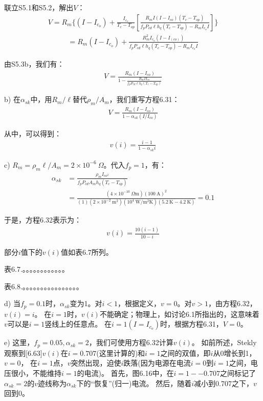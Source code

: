 联立S5.1和S5.2，解出$V$：
\begin{align*}%
V=R_m\{(I-I_{c_o})+\frac{I_{c_o}}{T_c-T_{op}}[\frac{R_mI(I-I_{co})(T_c-T_{op})}{f_pP_{cd}\ell h_q(T_c-T_{op})-R_mI_{c_o}I}]\} \tag{S5.3a}
\end{align*}
\begin{align*}%
=R_m(I-I_{c_o})+\frac{R_m^2I_{c_o}(I-I_(co))}{f_pP_{cd}\ell h_q(T_c-T_{op})-R_mI_{c_o}I} \tag{S5.3b}
\end{align*}

由S5.3b，我们有：
\begin{align*}%
V=\frac{R_m(I-I_{co})}{1-\frac{R_mII_{co}}{f_pP_{cd}\ell h_q(T_c-T_{op})}} \tag{6.31}
\end{align*}

b) 在$\alpha_{sk}$中，用$R_m/\ell$替代$\rho_m/A_m$，我们重写方程6.31：
\begin{align*}%
V=\frac{R_m(I-I_{co})}{1-\alpha_{sk}(I/I_{co})} \tag{S5.4}
\end{align*}

从中，可以得到：
\begin{align*}%
v(i)=\frac{i-1}{1-\alpha_{sk}i} \tag{6.32}
\end{align*}

c) $R_m=\rho_m \ell/A_m=2\times 10^{-6}\ \Omega$。代入$f_p=1$，有：
\begin{align*}%
\alpha_{sk}&=\frac{\rho_mI_{co^2}}{f_pP_{cd}A_mh_q(T_c-T_{op})}\\
&=\frac{(4\times10^{-10}\ \Omega\mathrm{m})(100\ \mathrm{A})^2}{(1)(2\times10^{-2}\ \mathrm{m^2})(10^4\ \mathrm{W/m^2K})(5.2\ \mathrm{K}-4.2\ \mathrm{K})}=0.1
\end{align*}

于是，方程6.32表示为：
\begin{align*}%
v(i)=\frac{10(i-1)}{10-i} \tag{S5.5}
\end{align*}

部分$i$值下的$v(i)$值如表6.7所列。

表6.7.。。。。。。。。。。。。

表6.8.。。。。。。。。。。。。。。。。

d) 当$f_p=0.1$时，$\alpha_{sk}$变为1。对$i<1$，根据定义，$v=0$。对$v>1$，由方程6.32，$v(i)=i$。
在$i=1$时，$v(i)$不能确定；物理上，如讨论6.1所指出的，这意味着$v$可以是$i=1$竖线上的任意点。
在$i=1(I=I_{c_o})$时，根据方程6.31，$V=0$。

e) 这里，$f_p = 0.05,\alpha_{sk} = 2$，我们可使用方程6.32计算$v(i)$。
如前所述，Stekly观察到[6.63]$v(i)$在$i=0.707$(这里计算的)和$i= 1$之间的双值，即$i$从0增长到1，$v=0$，
在$i=1$点，$v$突然出现，迫使$i$跌落(因为电源在电流$i=0$到$i=1$之间，电压很小，不能维持$i=1$的电流)。
首先，图6.16中，在$i=1--0.707$之间标记了$\alpha_{sk}=2$的$v$迹线称为$\alpha_{sk}$下的“恢复”(归一)电流。
然后，随着$i$减小到0.707之下，$v$回到0。 

